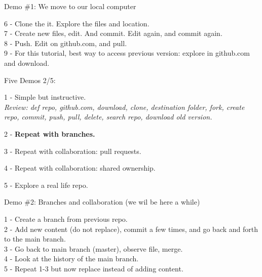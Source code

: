 \documentclass[ignorenonframetext,]{beamer}
\begin{document}
\begin{frame}{Demo \#1: We move to our local computer}
\protect\hypertarget{demo-1-we-move-to-our-local-computer}{}

6 - Clone the it. Explore the files and location.\\
7 - Create new files, edit. And commit. Edit again, and commit again.\\
8 - Push. Edit on github.com, and pull.\\
9 - For this tutorial, best way to access previous version: explore in
github.com and download.

\end{frame}

\begin{frame}{Five Demos 2/5:}
\protect\hypertarget{five-demos-25}{}

1 - Simple but instructive.\\
\emph{Review: def repo, github.com, download, clone, destination folder,
fork, create repo, commit, push, pull, delete, search repo, download old
version.}

2 - \textbf{Repeat with branches.}

3 - Repeat with collaboration: pull requests.

4 - Repeat with collaboration: shared ownership.

5 - Explore a real life repo.

\end{frame}

\begin{frame}{Demo \#2: Branches and collaboration (we wil be here a
while)}
\protect\hypertarget{demo-2-branches-and-collaboration-we-wil-be-here-a-while}{}

1 - Create a branch from previous repo.\\
2 - Add new content (do not replace), commit a few times, and go back
and forth to the main branch.\\
3 - Go back to main branch (master), observe file, merge.\\
4 - Look at the history of the main branch.\\
5 - Repeat 1-3 but now replace instead of adding content.

\end{frame}
\end{document}
